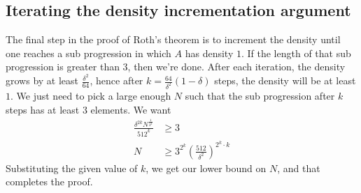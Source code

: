 \documentclass[12pt, titlepage]{article}
\theoremstyle{definition}
\begin{document}
\subsection{Iterating the density incrementation argument}
The final step in the proof of Roth's theorem is to increment the density until one reaches a sub progression in which $A$ has density $1$. If the length of that sub progression is greater than $3$, then we're done. After each iteration, the density grows by at least $\frac{\delta^2}{64}$, hence after $k = \frac{64}{\delta^2} \left( 1 - \delta \right)$ steps, the density will be at least $1$. We just need to pick a large enough $N$ such that the sub progression after $k$ steps has at least $3$ elements. We want
\begin{align*}
    \frac{\delta^{2k} N^{\frac{1}{2^k}}}{512^k} &\geq 3 \\
    N &\geq 3^{2^k} \left( \frac{512}{\delta^2} \right)^{2^k \cdot k}
\end{align*} 
Substituting the given value of $k$, we get our lower bound on $N$, and that completes the proof.
\newpage




\end{document}
